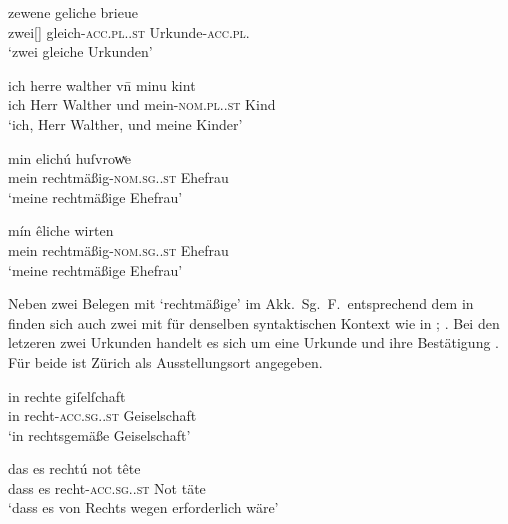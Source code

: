 \begin{exe}
\ex \label{ex:adjzuerregel}
	\begin{xlist}
	\ex \label{ex:adjzuerregel_1}
		\gll zewene geliche brieue \\
			zwei[\MascI] gleich-\textsc{acc.pl.\MascI.st}
				Urkunde-\textsc{acc.pl.\MascI} \\
		\trans `zwei gleiche Urkunden'
			\parencites(Nr.~2209, Zürich, 1295)[364,33]{cao3}

	\ex \label{ex:adjzuerregel_2}
		\gll ich herre walther vn̄ minu kint \\
			ich Herr Walther und mein-\textsc{nom.pl.\NeutX.st} Kind \\
		\trans `ich, Herr Walther, und meine Kinder'
			\parencites(Nr.~456, Hohenrain, Kt.~Luzern, 1281)[396,33--34]{cao1}
	\end{xlist}

\ex \label{ex:adjzueru}
	\begin{xlist}
	\ex \label{ex:adjzueru_1}
		\gll min elichú huſvrowͮe \\
			mein rechtmäßig-\textsc{nom.sg.\FemF.st} Ehefrau \\
		\trans `meine rechtmäßige Ehefrau'
			\parencites(Nr.~260, Hohenrain, Kt.~Luzern, 1276)[271,9]{cao1}

	\ex \label{ex:adjzueru_2}
		\gll mín êliche wirten \\
			mein rechtmäßig-\textsc{nom.sg.\FemF.st} Ehefrau \\
		\trans `meine rechtmäßige Ehefrau'
			\parencites(Nr.~1888, Hohenrain, Kt.~Luzern, 1294)[173,11]{cao3}
	\end{xlist}
\end{exe}

Neben zwei Belegen mit  `rechtmäßige' im Akk.\ Sg.\ F.\
entsprechend dem in \REF{ex:adjzuere_1} finden sich auch zwei mit \lit{rechtú}
für denselben syntaktischen Kontext wie in \REF{ex:adjzuere_3};
\citet[vgl. dazu][270--271]{ksw2}. Bei den letzeren zwei Urkunden handelt es
sich um eine Urkunde und ihre Bestätigung \autocite[375]{caor}. Für beide ist
Zürich als Ausstellungs\-ort angegeben.

\begin{exe}
\ex \label{ex:adjzuere}
	\begin{xlist}
	\ex \label{ex:adjzuere_1}
		\gll in rechte giſelſchaft \\
			in recht-\textsc{acc.sg.\FemI.st} Geiselschaft \\
		\trans `in rechtsgemäße Geiselschaft'
			\parencites(Nr.~35, Zürich, 1256 und Nr.~188, ebd., 1272)[66,31; 204,31]{cao1}

	\ex \label{ex:adjzuere_3}
		\gll das es rechtú not tête \\
			dass es recht-\textsc{acc.sg.\FemI.st} Not täte \\
		\trans `dass es von Rechts wegen erforderlich wäre'
			\parencites(Nr.~1591, Zürich, 1292 und Nr.~1756, ebd., 1292/93)[731,3]{cao2}[67,26--27]{cao3}
	\end{xlist}
\end{exe}

